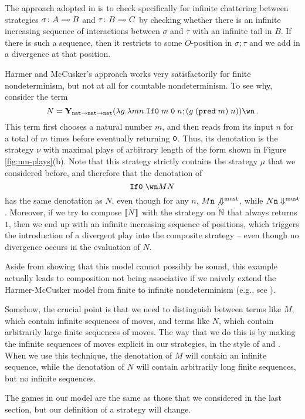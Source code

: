 \documentclass[sigplan,9pt,review]{acmart}\settopmatter{printfolios=true,printccs=false,printacmref=false}
\begin{document}
The approach adopted in \cite{mcCHFiniteND} is to check specifically for infinite chattering between strategies $\sigma\colon A\multimap B$ and $\tau\colon B\multimap C$ by checking whether there is an infinite increasing sequence of interactions between $\sigma$ and $\tau$ with an infinite tail in $B$.  
If there is such a sequence, then it restricts to some $O$-position in $\sigma;\tau$ and we add in a divergence at that position.  

Harmer and McCusker's approach works very satisfactorily for finite nondeterminism, but not at all for countable nondeterminism.  
To see why, consider the term
\[
  N = \Y_{\nat\to\nat\to\nat}(\lambda g.\lambda m n.\IfO m\;\0\;n;(g\;(\pred m)\;n))\wn\,.
  \]
This term first chooses a natural number $m$, and then reads from its input $n$ for a total of $m$ times before eventually returning ${\mathtt{0}}$.  
Thus, its denotation is the strategy $\nu$ with maximal plays of arbitrary length of the form shown in Figure \ref{fig:mn-plays}(b).
Note that this strategy strictly contains the strategy $\mu$ that we considered before, and therefore that the denotation of
\[
  \IfO \wn M N
  \]
has the same denotation as $N$, even though for any $n$, $M{\mathtt{n}}\not{\Downarrow^{\text{must}}}$, while $N{\mathtt{n}}\Downarrow^{\text{must}}$.
Moreover, if we try to compose $\left\llbracket N\right\rrbracket$ with the strategy on $\mathbb{N}$ that always returns $1$, then we end up with an infinite increasing sequence of positions, which triggers the introduction of a divergent play into the composite strategy -- even though no divergence occurs in the evaluation of $N$.

Aside from showing that this model cannot possibly be sound, this example actually leads to composition not being associative if we naively extend the Harmer-McCusker model from finite to infinite nondeterminism (e.g., see \cite[4.4.1]{RusssThesis}).  

Somehow, the crucial point is that we need to distinguish between terms like $M$, which contain infinite sequences of moves, and terms like $N$, which contain arbitrarily large finite sequences of moves.  
The way that we do this is by making the infinite sequences of moves explicit in our strategies, in the style of \cite{RoscoeCspInfinite} and \cite{LevyGsInfinite}.  
When we use this technique, the denotation of $M$ will contain an infinite sequence, while the denotation of $N$ will contain arbitrarily long finite sequences, but no infinite sequences.  

The games in our model are the same as those that we considered in the last section, but our definition of a strategy will change.
\end{document}
